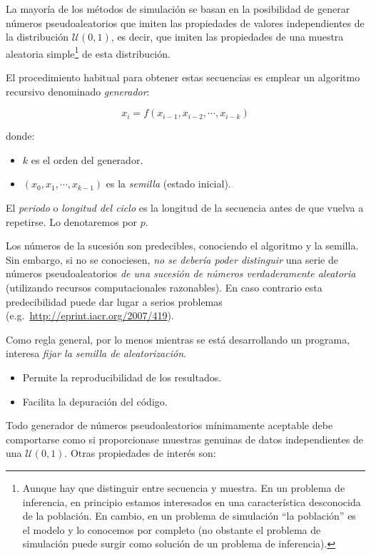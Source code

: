 \documentclass[
]{book}
\theoremstyle{break}
\theoremstyle{nonumberplain}
\begin{document}
La mayoría de los métodos de simulación se basan en la posibilidad de generar números pseudoaleatorios que imiten las propiedades de valores independientes de la distribución \(\mathcal{U}(0,1)\), es decir, que imiten las propiedades de una muestra aleatoria simple\footnote{Aunque hay que distinguir entre secuencia y muestra. En un problema de inferencia, en principio estamos interesados en una característica desconocida de la población. En cambio, en un problema de simulación ``la población'' es el modelo y lo conocemos por completo (no obstante el problema de simulación puede surgir como solución de un problema de inferencia).} de esta distribución.

El procedimiento habitual para obtener estas secuencias es emplear un algoritmo recursivo denominado \emph{generador}:

\[x_{i} = f\left( x_{i-1}, x_{i-2}, \cdots, x_{i-k}\right)\]

donde:

\begin{itemize}
\item
  \(k\) es el orden del generador.
\item
  \(\left( x_{0},x_{1},\cdots,x_{k-1}\right)\) es la \emph{semilla}
  (estado inicial).
\end{itemize}

El \emph{periodo} o \emph{longitud del ciclo} es la longitud de la secuencia antes de que vuelva a repetirse. Lo denotaremos por \(p\).

Los números de la sucesión son predecibles, conociendo el algoritmo y la semilla.
Sin embargo, si no se conociesen, \emph{no se debería poder distinguir} una serie de números pseudoaleatorios \emph{de una sucesión de números verdaderamente aleatoria} (utilizando recursos computacionales razonables).
En caso contrario esta predecibilidad puede dar lugar a serios
problemas (e.g.~\url{http://eprint.iacr.org/2007/419}).

Como regla general, por lo menos mientras se está desarrollando un
programa, interesa \emph{fijar la semilla de aleatorización}.

\begin{itemize}
\item
  Permite la reproducibilidad de los resultados.
\item
  Facilita la depuración del código.
\end{itemize}

Todo generador de números pseudoaleatorios mínimamente aceptable debe comportarse como si proporcionase muestras genuinas de datos independientes de una \(\mathcal{U}(0,1)\).
Otras propiedades de interés son:
\end{document}

